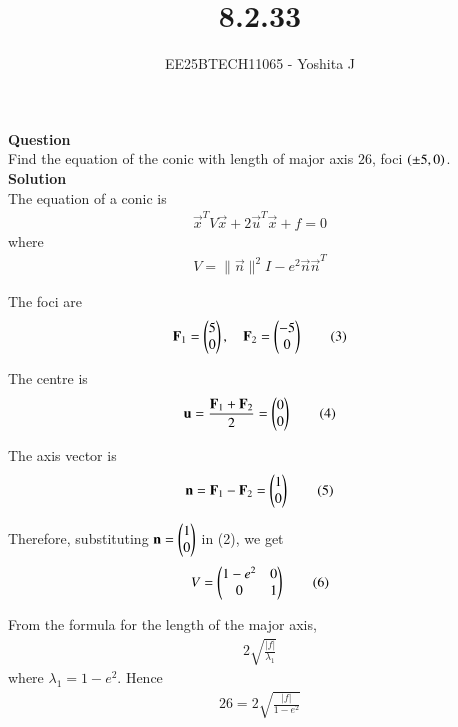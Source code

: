 \documentclass[journal]{IEEEtran}
\begin{document}

\vspace{3cm}

\title{8.2.33}
\author{EE25BTECH11065 - Yoshita J}

{\let\newpage\relax\maketitle}

\renewcommand{\thefigure}{\theenumi}
\renewcommand{\thetable}{\theenumi}
\setlength{\intextsep}{10pt}

\textbf{Question}\\
Find the equation of the conic with length of major axis $26$, foci $\left(\pm 5,0\right)$.\\

\textbf{Solution}\\
The equation of a conic is
\begin{align}
\vec{x}^T V \vec{x} + 2\vec{u}^T \vec{x} + f = 0 \tag{1}
\end{align}
where
\begin{align}
V = \|\vec{n}\|^2 I - e^2\vec{n}\vec{n}^T \tag{2}
\end{align}

The foci are
\begin{align}
\mathbf{F}_1 = \begin{pmatrix}5\\0\end{pmatrix},\quad \mathbf{F}_2 = \begin{pmatrix}-5\\0\end{pmatrix} \tag{3}
\end{align}

The centre is
\begin{align}
\mathbf{u} = \frac{\mathbf{F}_1+\mathbf{F}_2}{2} = \begin{pmatrix}0\\0\end{pmatrix} \tag{4}
\end{align}

The axis vector is
\begin{align}
\mathbf{n} = \mathbf{F}_1-\mathbf{F}_2 = \begin{pmatrix}1\\0\end{pmatrix} \tag{5}
\end{align}

Therefore, substituting $\mathbf{n}=\begin{pmatrix}1\\0\end{pmatrix}$ in (2), we get
\begin{align}
V = \begin{pmatrix}1-e^2 & 0 \\ 0 & 1\end{pmatrix} \tag{6}
\end{align}

From the formula for the length of the major axis,
\begin{align}
2\sqrt{\frac{|f|}{\lambda_1}} \tag{7}
\end{align}
where $\lambda_1 = 1-e^2$. Hence
\begin{align}
26 = 2\sqrt{\frac{|f|}{1-e^2}} \tag{8}
\end{align}
\end{document}
